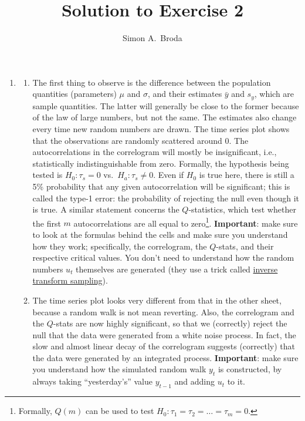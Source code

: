 \documentclass[11pt, a4paper]{article}
\begin{document}
\title{Solution to Exercise 2}
\author{Simon A.\ Broda}
\date{}
\maketitle

\begin{enumerate}
\item
\begin{enumerate}
\item The first thing to observe is the difference between the population quantities (parameters) $\mu$ and $\sigma$, and their estimates $\bar y$ and $s_y$, which are sample quantities. The latter will generally be close to the former because of the law of large numbers, but not the same. The estimates also change every time new random numbers are drawn. The time series plot shows that the observations are randomly scattered around 0. The autocorrelations in the correlogram will mostly be insignificant, i.e., statistically indistinguishable from zero. Formally, the hypothesis being tested is $H_0: \tau_s=0$ vs.\ $H_a: \tau_s\neq0$. Even if $H_0$ is true here, there is still a 5\% probability that any given autocorrelation will be significant; this is called the type-1 error: the probability of rejecting the null even though it is true. A similar statement concerns the $Q$-statistics, which test whether the first $m$ autocorrelations are all equal to zero\footnote{Formally, $Q(m)$ can be used to test $H_0: \tau_1=\tau_2=\ldots=\tau_m=0$.}. \textbf{Important}: make sure to look at the formulas behind the cells and make sure you understand how they work; specifically, the correlogram, the $Q$-stats, and their respective critical values. You don't need to understand how the random numbers $u_t$ themselves are generated (they use a trick called \href{https://en.wikipedia.org/wiki/Inverse_transform_sampling}{inverse transform sampling}).
\item The time series plot looks very different from that in the other sheet, because a random walk is not mean reverting. Also, the correlogram and the $Q$-stats are now highly significant, so that we (correctly) reject the null that the data were generated from a white noise process. In fact, the slow and almost linear decay of the correlogram suggests (correctly) that the data were generated by an integrated process. \textbf{Important}: make sure you understand how the simulated random walk $y_t$ is constructed, by always taking ``yesterday's'' value $y_{t-1}$ and adding $u_t$ to it.
\end{enumerate}

\end{enumerate}
\end{document}

